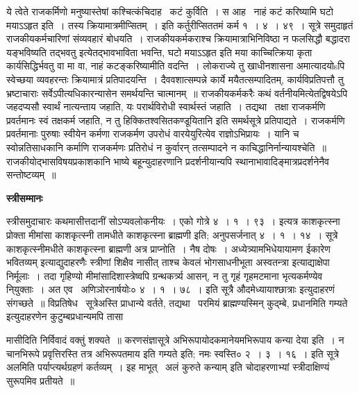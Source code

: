 \documentclass[11pt, openany]{book}
\begin{document}
ये त्वेते राजकर्मिणो मनुष्यास्तेषां कश्चित्कंचिदाह \textendash\ कटं कुर्विति~। स आह \textendash\ नाहं कटं करिष्यामि घटो मयाऽऽहृत इति~। तस्य क्रियामात्रमीप्सितम्~। इति कर्तुरीप्सिततमं कर्म १~। ४~। ४९~। सूत्रे समुदाहृतं राजकीयकर्मचारिणां संव्यवहारं बोधयति~। राजकीयकर्मकराश्च क्रियामात्राभिनिविष्ठा न फलसिद्धौ बद्धादरा {\qt यङ्भविष्यति तद्भवतु} इत्येतद्भावभाविता भवन्ति, घटो मयाऽऽहृत इति मया काच्चित्क्रिया कृता कार्यसिद्धिर्भवतु वा मा वा, नाहं कटङ्करिष्यामीति वदन्ति~। लोकराज्ये तु खाधीनशासना अमात्यादयोsपि स्वेच्छया व्यवहरन्तः क्रियामात्रं प्रतिपादयन्ति~। दैववशात्सम्पन्ने कार्ये मयैतत्सम्पादितम्, कार्यविप्रतिपत्तौ तु भ्रष्टाचाराः सर्वेऽपीत्यधिकारन्यासेन समर्थयन्ति चात्मानम्~॥ राजकीयकर्मकरैः कथं वर्तनीयमित्येतद्विषयेऽपि {\qt जहदप्यसौ स्वार्थं नात्यन्ताय जहाति, यः परार्थविरोधी स्वार्थस्तं जहाति~। तद्यथा \textendash\ तक्षा राजकर्मणि प्रवर्तमानः स्वं तक्षकर्म जहाति, न तु हिक्कितश्वसितकण्डूयितानि} इति समर्थसूत्रे प्रतिपाद्यते~। राजकर्मणि प्रवर्तमानाः पुरुषाः स्वीयेन कर्मणा राजकर्मण उपरोधं वारयेयुरित्येव राज्ञोऽभिप्रायः~। यानि च स्वोन्नतिसाधकानि कर्माणि राजकर्मणः प्रतिरोधं न कुर्वारन् तत्सम्पादने न काचिद्धानिर्नान्यायश्चेति~॥ राजकीयोद्भासविषयप्रकाशकानि भाष्ये बहून्युदाहरणानि प्रदर्शनीयान्यपि स्थानाभावादिङ्मात्रप्रदर्शनेनैव सन्तोष्टव्यम्~॥

\begin{center}
\textbf{\Large स्त्रीसम्मानः \textendash\ }
\end{center}

स्त्रीसमुदाचारः कथमासीत्तदानीं सोऽप्यवलोकनीयः~। एको गोत्रे ४~। १~। ९३~। इत्यत्र {\qt काशकृत्स्ना प्रोक्ता मीमांसा काशकृत्स्नी तामधीते काशकृत्स्ना ब्राह्मणी} इति; अनुपसर्जनात् ४~। १~। १४~। सूत्रे {\qt काशकृत्स्नीमधीते काशकृत्स्ना ब्राह्मणी अत्र प्राप्नोति~। नैष दोषः~। अध्येत्र्यामभिधेयायामण ईकारेण भवितव्यम्} इत्याद्युदाहरणैः स्त्रीणां शिक्षैव नासीत् ताश्च केवलं भोगसाधनीभूता अस्वतन्त्रा इत्याद्याक्षेपा निर्मूलाः~। तदा गृहिण्यो मीमांसादिशास्त्रेष्वपि ग्रन्थकर्त्र्य आसन्, न तु गृहं गृहमटमाना भृत्यकर्मण्येव नि्युक्ताः~। अत एव \textendash\ अणिञोरनार्षयोः० ४~। १~। ७८~। इति सूत्रै {\qt औदमेध्यायाश्छात्राः} इत्युदाहरणं संगच्छते~॥ विप्रतिषेध \textendash\ सूत्रे{\qt अस्ति प्राधान्ये वर्तते, तद्यथा \textendash\ परमियं ब्राह्मण्यस्मिन् कुद्म्बे, प्रधानमिति गम्यते} इत्युदाहरणेन कुटुम्बप्रधान्यमपि तासा \textendash\

\newpage

\noindent
मासीदिति निर्विवादं वक्तुं शक्यते~॥ करणसंज्ञासूत्रे {\qt अभिरूपायोदकमानेयमभिरूपाय कन्या देया इति~। न चानभिरूपे प्रवृत्तिरस्ति तत्र अभिरूपतमाय इति गम्यते} इति; नमः स्वस्ति० २~। ३~। १६~। इति सूत्रे अलमिति पर्याप्त्यर्थग्रहणं कर्तव्यम्~। इह माभूत् \textendash\ अलं कुरुते कन्याम् इति चोदाहरणाभ्यां स्त्रीदाक्षिण्यं सुरूपमिव प्रतीयते~॥
\end{document}
